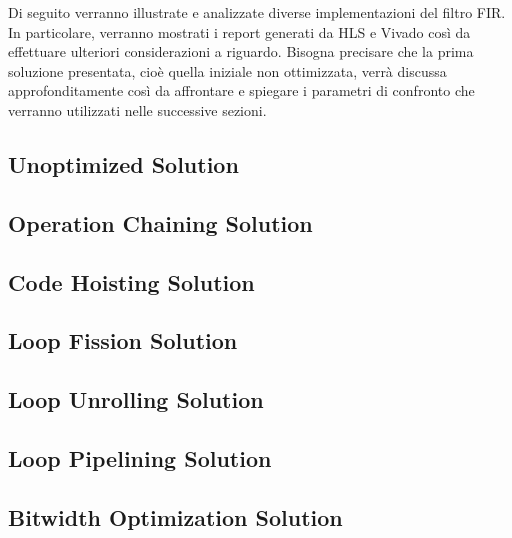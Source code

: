 Di seguito verranno illustrate e analizzate diverse implementazioni del filtro FIR. In particolare, verranno mostrati i report generati da HLS e Vivado così da effettuare ulteriori considerazioni a riguardo. Bisogna precisare che la prima soluzione presentata, cioè quella iniziale non ottimizzata, verrà discussa approfonditamente così da affrontare e spiegare i parametri di confronto che verranno utilizzati nelle successive sezioni.

\subsection{Unoptimized Solution}

\newpage

\subsection{Operation Chaining Solution}

\newpage

\subsection{Code Hoisting Solution}

\newpage

\subsection{Loop Fission Solution}

\newpage

\subsection{Loop Unrolling Solution}

\newpage

\subsection{Loop Pipelining Solution}

\newpage

\subsection{Bitwidth Optimization Solution}

